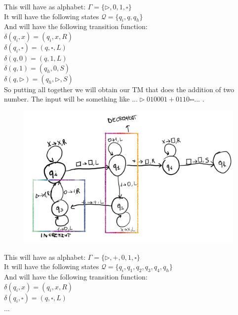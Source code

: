 This will have as alphabet:  \(\Gamma = \{\rhd, 0, 1,  \square\}\) \\
It will have the following states \(\mathcal{Q} = \{q_i, q, q_h\}\) \\
And will have the following transition function:\\
\(\delta (q_i, x) = (q_i, x, R)\)  \\
\(\delta (q_i, \square ) = (q, \square, L)\)  \\
\(\delta (q, 0 ) = (q, 1, L)\) \\
\(\delta (q, 1 ) = (q_h, 0, S)\) \\
\(\delta (q, \rhd ) = (q_h, \rhd, S)\) \\

So putting all together we will obtain our TM that does the addition of two number. The input will be something like \(...\rhd 010001+0110\square \square...\) .
\begin{figure}[H]
	\centerline{\includegraphics[scale=0.4]{figures/old/TM_addition}}
\end{figure}
This will have as alphabet:  \(\Gamma = \{\rhd, +, 0, 1,  \square\}\) \\
It will have the following states \(\mathcal{Q} = \{q_i, q_1,q_2,q_3,q_4, q_h\}\) \\
And will have the following transition function:\\
\(\delta (q_i, x) = (q_i, x, R)\)  \\
\(\delta (q_i, \square ) = (q, \square, L)\)  \\
... \\

